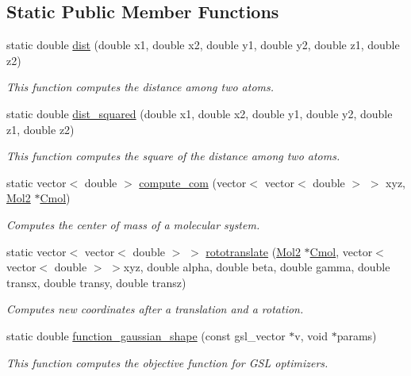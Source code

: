 \subsection*{Static Public Member Functions}
\begin{DoxyCompactItemize}
\item 
static double \hyperlink{classMinimizer2_a6626777b2e2a1b09d2a1c925f45962a4}{dist} (double x1, double x2, double y1, double y2, double z1, double z2)
\begin{DoxyCompactList}\small\item\em This function computes the distance among two atoms. \end{DoxyCompactList}\item 
static double \hyperlink{classMinimizer2_aa34e6305d001acec8ac2238f6ec672ab}{dist\_\-squared} (double x1, double x2, double y1, double y2, double z1, double z2)
\begin{DoxyCompactList}\small\item\em This function computes the square of the distance among two atoms. \end{DoxyCompactList}\item 
static vector$<$ double $>$ \hyperlink{classMinimizer2_addd14de621061132835370b3d02cd405}{compute\_\-com} (vector$<$ vector$<$ double $>$ $>$ xyz, \hyperlink{classMol2}{Mol2} $\ast$\hyperlink{classMinimizer2_af79d496194cba04903627d821f0faca3}{Cmol})
\begin{DoxyCompactList}\small\item\em Computes the center of mass of a molecular system. \end{DoxyCompactList}\item 
static vector$<$ vector$<$ double $>$ $>$ \hyperlink{classMinimizer2_a7bc4c2fe892e0339048d9ca7932cdf69}{rototranslate} (\hyperlink{classMol2}{Mol2} $\ast$\hyperlink{classMinimizer2_af79d496194cba04903627d821f0faca3}{Cmol}, vector$<$ vector$<$ double $>$ $>$xyz, double alpha, double beta, double gamma, double transx, double transy, double transz)
\begin{DoxyCompactList}\small\item\em Computes new coordinates after a translation and a rotation. \end{DoxyCompactList}\item 
static double \hyperlink{classMinimizer2_a62fa0872db1e16736f810a2e6f99c2f1}{function\_\-gaussian\_\-shape} (const gsl\_\-vector $\ast$v, void $\ast$params)
\begin{DoxyCompactList}\small\item\em This function computes the objective function for GSL optimizers. \end{DoxyCompactList}\item 

\end{DoxyCompactItemize}
